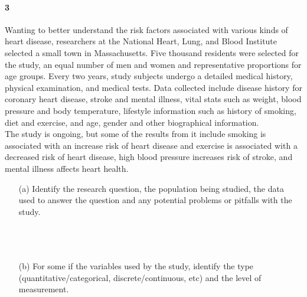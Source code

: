 \documentclass{article}
\begin{document}
\begin{flushleft}
\paragraph{3} Wanting to better understand the risk factors associated with various kinds of heart disease, researchers at the National Heart, Lung, and Blood Institute selected a small town in Massachusetts. Five thousand residents were selected for the study, an equal number of men and women and representative proportions for age groups. Every two years, study subjects undergo a detailed medical history, physical examination, and medical tests. Data collected include disease history for coronary heart disease, stroke and mental illness, vital stats such as weight, blood pressure and body temperature, lifestyle information such as history of smoking, diet and exercise, and age, gender and other biographical information.\\
\medskip
The study is ongoing, but some of the results from it include smoking is associated with an increase risk of heart disease and exercise is associated with a decreased risk of heart disease, high blood pressure increases risk of stroke, and mental illness affects heart health.

\begin{itemize}
\item [(a)] Identify the research question, the population being studied, the data used to answer the question and any potential problems or pitfalls with the study.\\
\medskip
{}\\
\medskip{}\\
\medskip{}\\
\medskip{}
\vspace{.25in}
\item[(b)] For some if the variables used by the study, identify the type (quantitative/categorical, discrete/continuous, etc) and the level of measurement.\\
\medskip
{}
\end{itemize}



\end{flushleft}
\end{document}
